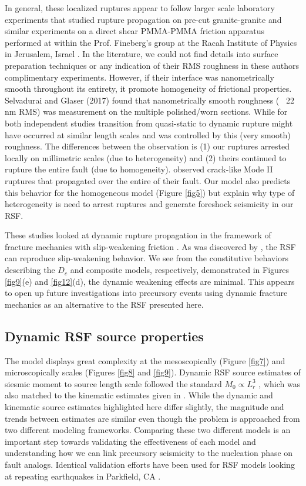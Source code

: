 \documentclass[preprint,1p, 10pt,authoryear]{elsarticle}
\begin{document}
In general, these localized ruptures appear to follow larger scale laboratory experiments that studied rupture propagation on pre-cut granite-granite \citep{Passelegue2013} and similar experiments on a direct shear PMMA-PMMA friction apparatus performed at within the Prof. Fineberg's group at the Racah Institute of Physics in Jerusalem, Israel \citep{Rubinstein2004,Rubinstein2006,Ben-David2010, Fineberg2015,Svetlizky2014}. In the literature, we could not find details into surface preparation techniques or any indication of their RMS roughness in these authors complimentary experiments. However, if their interface was nanometrically smooth throughout its entirety, it promote homogeneity of frictional properties. Selvadurai and Glaser (2017) found that nanometrically smooth roughness (~ 22 nm RMS) was measurement on the multiple polished/worn sections. While for both independent studies transition from quasi-static to dynamic rupture might have occurred at similar length scales and was controlled by this (very smooth) roughness. The differences between the observation is (1) our ruptures arrested locally on millimetric scales (due to heterogeneity) and (2) theirs continued to rupture the entire fault (due to homogeneity). \citet{Svetlizky2014} observed crack-like Mode II ruptures that propagated over the entire of their fault. Our model also predicts this behavior for the homogeneous model (Figure \ref{fig5}) but explain why type of heterogeneity is need to arrest ruptures and generate foreshock seismicity in our RSF.

These studies looked at dynamic rupture propagation in the framework of fracture mechanics with slip-weakening friction \citep{Ida1972,Andrews1976,Kammer2012,Kammer2015}.  As was discovered by \citet{Cocco2002}, the RSF can reproduce slip-weakening behavior. We see from the constitutive behaviors describing the $D_{c}$  and composite models, respectively, demonstrated in Figures \ref{fig9}(e) and \ref{fig12}(d), the dynamic weakening effects are minimal. This appears to open up future investigations into precursory events using dynamic fracture mechanics as an alternative to the RSF presented here.

\subsection{Dynamic RSF source properties}
The model displays great complexity at the mesoscopically (Figure \ref{fig7}) and microscopically scales (Figures \ref{fig8} and \ref{fig9}). Dynamic RSF source estimates of siesmic moment to source length scale followed the standard $M_{0} \propto L^{3}_{r}$ , which was also matched to the kinematic estimates given in \citet{Selvadurai2019}. While the dynamic and kinematic source estimates highlighted here differ slightly, the magnitude and trends between estimates are similar even though the problem is approached from two different modeling frameworks. Comparing these two different models is an important step towards validating the effectiveness of each model and understanding how we can link precursory seismicity to the nucleation phase on fault analogs. Identical validation efforts have been used for RSF models looking at repeating earthquakes in Parkfield, CA \citep{Chen2009}.
\end{document}
